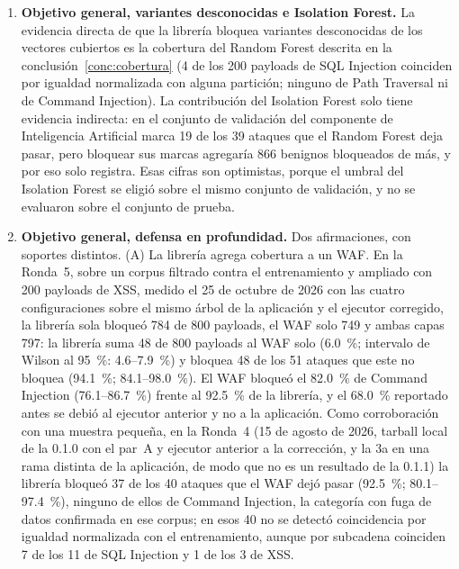 \begin{enumerate}
    \item \textbf{Objetivo general, variantes desconocidas e Isolation Forest.}\label{conc:variantes}
    La evidencia directa de que la librería bloquea variantes desconocidas de los vectores cubiertos
    es la cobertura del Random Forest descrita en la conclusión~\ref{conc:cobertura} (4 de los 200 payloads de SQL
    Injection coinciden por igualdad normalizada con alguna partición; ninguno de Path Traversal ni
    de Command Injection). La contribución del Isolation Forest solo tiene evidencia indirecta: en
    el conjunto de validación del componente de Inteligencia Artificial \cite{valenzuela2026ia} marca 19 de los 39 ataques
    que el Random Forest deja pasar, pero bloquear sus marcas agregaría 866 benignos bloqueados de
    más, y por eso solo registra. Esas cifras son optimistas, porque el umbral del Isolation Forest
    se eligió sobre el mismo conjunto de validación, y no se evaluaron sobre el conjunto de prueba.

    \item \textbf{Objetivo general, defensa en profundidad.}\label{conc:waf} Dos afirmaciones, con soportes
    distintos. (A) La librería agrega cobertura a un WAF. En la Ronda~5, sobre un corpus filtrado
    contra el entrenamiento y ampliado con 200 payloads de XSS, medido el 25 de octubre de 2026 con
    las cuatro configuraciones sobre el mismo árbol de la aplicación y el ejecutor corregido, la
    librería sola bloqueó 784 de 800 payloads, el WAF solo 749 y ambas capas 797: la librería suma
    48 de 800 payloads al WAF solo (6.0~\%; intervalo de Wilson al 95~\%: 4.6--7.9~\%) y bloquea 48
    de los 51 ataques que este no bloquea (94.1~\%; 84.1--98.0~\%). El WAF bloqueó el 82.0~\% de
    Command Injection (76.1--86.7~\%) frente al 92.5~\% de la librería, y el 68.0~\% reportado antes
    se debió al ejecutor anterior y no a la aplicación. Como corroboración con una muestra pequeña,
    en la Ronda~4 (15 de agosto de 2026, tarball local de la 0.1.0 con el par~A y ejecutor anterior a
    la corrección, y la 3a en una rama distinta de la aplicación, de modo que no es un resultado de
    la 0.1.1) la librería bloqueó 37 de los 40
    ataques que el WAF dejó pasar (92.5~\%; 80.1--97.4~\%), ninguno de ellos de Command Injection,
    la categoría con fuga de datos confirmada en ese corpus; en esos 40 no se detectó coincidencia
    por igualdad normalizada con el entrenamiento, aunque por subcadena coinciden 7 de los 11 de SQL
    Injection y 1 de los 3 de XSS.


\end{enumerate}
